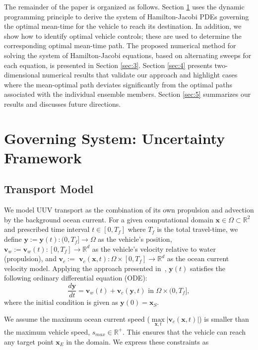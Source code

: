 \documentclass[pdflatex,sn-mathphys-num]{sn-jnl}%
\def \bx{{\mathbf {x}}}
\def \by{{\mathbf {y}}}
\def \bv{{\mathbf {v}}}
\theoremstyle{thmstyleone}%
\theoremstyle{thmstyletwo}%
\theoremstyle{thmstylethree}%
\begin{document}
The remainder of the paper is organized as follows. Section \ref{sec:2} uses the dynamic programming principle to derive the system of Hamilton-Jacobi PDEs governing the optimal mean-time for the vehicle to reach its destination.  In addition, we show how to identify optimal vehicle controls; these are used to determine the corresponding optimal mean-time path.  
The proposed numerical method for solving the system of Hamilton-Jacobi equations, based on alternating sweeps for each equation, is presented in Section \ref{sec:3}.  Section \ref{sec:4} presents two-dimensional numerical results that validate our approach and highlight cases where the mean-optimal path deviates significantly from the optimal paths associated with the individual ensemble members.  Section \ref{sec:5} summarizes our results and discusses future directions.



\section{Governing System: Uncertainty Framework}
\label{sec:2}


\subsection{Transport Model}

We model UUV transport as the combination of its own propulsion and advection by the background ocean current.
For a given computational domain $\bx \in \Omega  \subset \mathbb{R}^2$ and prescribed time interval $t \in [0,T_f]$ where $T_f$ is the total travel-time, we define $\by :=\by(t): (0,T_f] \rightarrow \Omega$ as the vehicle's position, $\bv_w:=\bv_w(t): [0,T_f] \rightarrow \mathbb{R}^d$ as the vehicle's velocity relative to water (propulsion), and $\bv_c:= $ $\bv_c(\bx,t):\Omega \times [0,T_f] \rightarrow \mathbb{R}^d$ as the ocean current velocity model. Applying the approach presented in~\cite{Brandman2023}, $\by(t)$ satisfies the following ordinary differential equation (ODE):
\begin{equation}
   \frac{d\by}{dt} = \bv_w(t) + \bv_{c}(\by,t) \text { in } \Omega \times (0,T_f],
\label{eqn:det-ode}
\end{equation}
where the initial condition is given as 
$\by(0) = \bx_S$.

We assume the maximum ocean current speed ($\max\limits_{\bx,t}$$|\bv_c(\bx,t)|$) is smaller than the maximum vehicle speed, $s_{max}\in \mathbb{R}^+$.  This ensures that the vehicle can reach any target point $\bx_E$ in the domain. We express these constraints as
\end{document}
